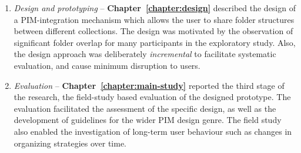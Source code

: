 \begin{enumerate}
\item \textit{Design and prototyping} -- \textbf{Chapter~\ref{chapter:design}} described the design of a PIM-integration mechanism which allows the user to share folder structures between different collections. The design was motivated by the observation of significant folder overlap for many participants in the exploratory study. Also, the design approach was deliberately \textit{incremental} to facilitate systematic evaluation, and cause minimum disruption to users.  %

\item \textit{Evaluation} -- \textbf{Chapter~\ref{chapter:main-study}} reported the third stage of the research, the field-study based evaluation of the designed prototype.  The evaluation facilitated the assessment of the specific design, as well as the development of guidelines for the wider PIM design genre.  The field study also enabled the investigation of long-term user behaviour such as changes in organizing strategies over time. 


\end{enumerate}
